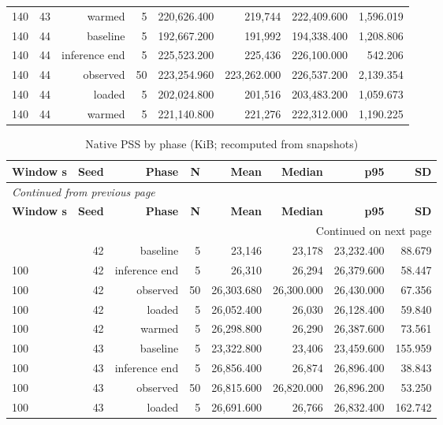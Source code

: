 \documentclass[10pt,a4paper]{article}
\begin{document}
\begin{longtable}{@{}lrrrrrrr@{}}
140 & 43 & warmed & 5 & 220,626.400 & 219,744 & 222,409.600 & 1,596.019 \\
140 & 44 & baseline & 5 & 192,667.200 & 191,992 & 194,338.400 & 1,208.806 \\
140 & 44 & inference end & 5 & 225,523.200 & 225,436 & 226,100.000 & 542.206 \\
140 & 44 & observed & 50 & 223,254.960 & 223,262.000 & 226,537.200 & 2,139.354 \\
140 & 44 & loaded & 5 & 202,024.800 & 201,516 & 203,483.200 & 1,059.673 \\
140 & 44 & warmed & 5 & 221,140.800 & 221,276 & 222,312.000 & 1,190.225 \\
\end{longtable}\endgroup
\begingroup\small\setlength{\tabcolsep}{4pt}\renewcommand{\arraystretch}{1.12}
\begin{longtable}{@{}lrrrrrrr@{}}
\caption{Native PSS by phase (KiB; recomputed from snapshots)}\\
\toprule
\textbf{Window s} & \textbf{Seed} & \textbf{Phase} & \textbf{N} & \textbf{Mean} & \textbf{Median} & \textbf{p95} & \textbf{SD} \\
\midrule\endfirsthead
\multicolumn{8}{l}{\small\itshape Continued from previous page}\\
\toprule
\textbf{Window s} & \textbf{Seed} & \textbf{Phase} & \textbf{N} & \textbf{Mean} & \textbf{Median} & \textbf{p95} & \textbf{SD} \\
\midrule\endhead
\midrule\multicolumn{8}{r}{\small Continued on next page}\\\endfoot
\bottomrule\endlastfoot
100 & 42 & baseline & 5 & 23,146 & 23,178 & 23,232.400 & 88.679 \\
100 & 42 & inference end & 5 & 26,310 & 26,294 & 26,379.600 & 58.447 \\
100 & 42 & observed & 50 & 26,303.680 & 26,300.000 & 26,430.000 & 67.356 \\
100 & 42 & loaded & 5 & 26,052.400 & 26,030 & 26,128.400 & 59.840 \\
100 & 42 & warmed & 5 & 26,298.800 & 26,290 & 26,387.600 & 73.561 \\
100 & 43 & baseline & 5 & 23,322.800 & 23,406 & 23,459.600 & 155.959 \\
100 & 43 & inference end & 5 & 26,856.400 & 26,874 & 26,896.400 & 38.843 \\
100 & 43 & observed & 50 & 26,815.600 & 26,820.000 & 26,896.200 & 53.250 \\
100 & 43 & loaded & 5 & 26,691.600 & 26,766 & 26,832.400 & 162.742 \\

\end{longtable}
\end{document}
